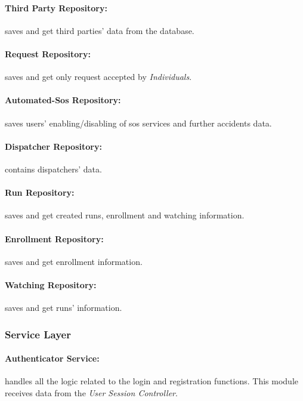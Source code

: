 \documentclass[a4paper]{article}
\begin{document}
    \paragraph{Third Party Repository:}
    saves and get third parties' data from the database.
    
    \paragraph{Request Repository:}
    saves and get only request accepted by \textit{Individuals}.
    
    \paragraph{Automated-Sos Repository:}
    saves users' enabling/disabling of sos services and further accidents data.
    
    \paragraph{Dispatcher Repository:}
    contains dispatchers' data.
    
    \paragraph{Run Repository:}
    saves and get created runs, enrollment and watching information.
    
    \paragraph{Enrollment Repository:}
    saves and get enrollment information.
    
    \paragraph{Watching Repository:}
    saves and get runs' information.
    
    \subsubsection{Service Layer}

    \paragraph{Authenticator Service:}
    handles all the logic related to the login and registration functions. This module receives data from the \textit{User Session Controller}.
\end{document}
